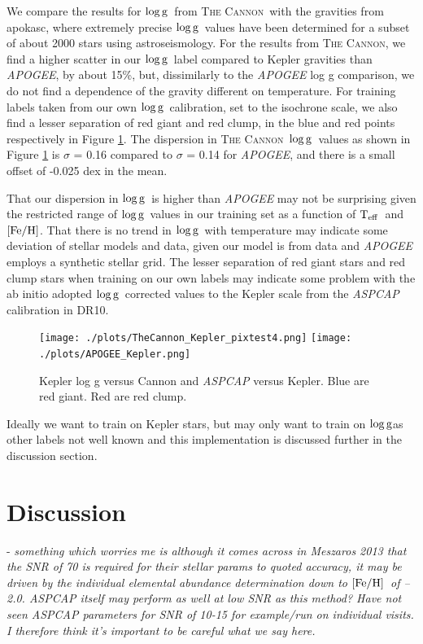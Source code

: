 \documentclass[12pt, preprint]{aastex}
\newcommand{\teff}{\mbox{$\rm T_{eff}$}}
\newcommand{\feh}{\mbox{$\rm [Fe/H]$}}
\newcommand{\logg}{\mbox{$\rm \log g$}}
\newcommand{\tc}{\textsc{The Cannon}}
\begin{document}
We compare the results for \logg\ from \tc\ with the gravities from apokasc, where extremely precise \logg\ values have been determined for a subset of about 2000 stars using astroseismology. For the results from \tc, we find a higher scatter in our \logg\ label compared to Kepler gravities than \textit{APOGEE}, by about 15\%, but, dissimilarly to the \textit{APOGEE} log g comparison, we do not find a dependence of the gravity different on temperature. For training labels taken from our own \logg\ calibration, set to the isochrone scale, we also find a lesser separation of red giant and red clump, in the blue and red points respectively in Figure \ref{fig:kepler}. The dispersion in \tc\ \logg\ values as shown in Figure \ref{fig:kepler} is $\sigma$ = 0.16 compared to $\sigma$ =  0.14 for \textit{APOGEE}, and there is a small offset of -0.025 dex in the mean. 

That our dispersion in \logg\ is higher than \textit{APOGEE} may not be surprising given the restricted range of \logg\ values in our training set as a function of \teff\ and \feh. That there is no trend in \logg\ with temperature may indicate some deviation of stellar models and data, given our model is from data and \textit{APOGEE} employs a synthetic stellar grid. The lesser separation of red giant stars and red clump stars when training on our own labels may indicate some problem with the ab initio adopted \logg\ corrected values to the Kepler scale from the \textit{ASPCAP} calibration in DR10.

  \begin{figure}[h!]
 \texttt{[image: ./plots/TheCannon\_Kepler\_pixtest4.png]}
  \texttt{[image: ./plots/APOGEE\_Kepler.png]}
 \caption{Kepler log g versus Cannon and \textit{ASPCAP} versus Kepler. Blue are red giant. Red are red clump.}
\label{fig:kepler}
\end{figure}


Ideally we want to train on Kepler stars, but may only want to train on \logg as other labels not well known and this implementation is discussed further in the discussion section. 


\section{Discussion}

- \textit{something which worries me is although it comes across in Meszaros 2013 that the SNR of 70 is required for their stellar params to quoted accuracy, it may be driven by the individual elemental abundance determination down to \feh\ of --2.0. \textit{ASPCAP} itself may perform as well at low SNR as this method? Have not seen \textit{ASPCAP} parameters for SNR of 10-15 for example/run on individual visits. I therefore think it's important to be careful what we say here.} \\
\end{document}
